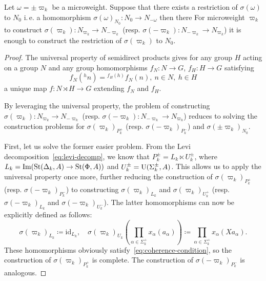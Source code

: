 \begin{lemma} \label{lem:first-reduction}
 Let $\omega = \pm \varpi_k$ be a microweight.
 Suppose that there exists a restriction of $\sigma(\omega)$ to $N_0$ i.\,e. a homomorphism
 $\sigma(\omega)_{N_0} \colon N_0 \to N_{-\omega}$
 then there
 For microweight $\varpi_k$ to construct $\sigma(\varpi_k) \colon N_{\varpi_k} \to N_{-\varpi_k}$
 (resp. $\sigma(-\varpi_k)\colon N_{-\varpi_k} \to N_{\varpi_k}$) it is enough to construct the restriction of $\sigma(\varpi_k)$ to $N_0$.
\end{lemma}
\begin{proof}

    The universal property of semidirect products gives for any group $H$ acting on a group $N$
    and any group homomorphisms $f_N\colon N \to G$, $f_H\colon H \to G$ satisfying
    \begin{equation}
        \label{eq:coherence-condition} f_N({}^hn) = {}^{f_H(h)} f_N(n),\ n\in N,\ h\in H
    \end{equation}
    a unique map $f\colon N \rtimes H \to G$ extending $f_N$ and $f_H$.

    By leveraging the universal property, the problem of constructing \( \sigma(\varpi_k) \colon N_{\varpi_k} \to N_{-\varpi_k} \)
    (resp. $\sigma(-\varpi_k) \colon N_{-\varpi_k} \to N_{\varpi_k}$)
    reduces to solving the construction problems for \( \sigma(\varpi_k)_{P_k^+} \) (resp. $\sigma(-\varpi_k)_{P_k^-}$) and \( \sigma(\pm\varpi_k)_{N_0} \).

    First, let us solve the former easier problem.
    From the Levi decomposition~\eqref{eq:levi-decomp}, we know that \( P_k^\pm = L_k \ltimes U_k^\pm \), where \( L_k = \mathrm{Im}(\operatorname{St}(\Delta_k, A) \to \operatorname{St}(\Phi, A)) \) and \( U_k^\pm = \operatorname{U}(\Sigma_k^\pm, A) \).
    This allows us to apply the universal property once more, further reducing the construction of \( \sigma(\varpi_k)_{P_k^+} \) (resp. $\sigma(-\varpi_k)_{P_k^-}$)
    to constructing \( \sigma(\varpi_k)_{L_k} \) and \( \sigma(\varpi_k)_{U_k^+} \) (resp. \( \sigma(-\varpi_k)_{L_k} \) and \( \sigma(-\varpi_k)_{U_k^-} \)).
    The latter homomorphisms can now be explicitly defined as follows:
    \begin{equation} \label{eq:sigma-Pk} \sigma(\varpi_k)_{L_k} \coloneqq \mathrm{id}_{L_k}, \quad \sigma(\varpi_k)_{U_k} \left(\prod_{\alpha \in \Sigma_k^+} x_\alpha(a_\alpha)\right) \coloneqq \prod_{\alpha \in \Sigma_k^+} x_\alpha(Xa_\alpha).\end{equation}
    These homomorphisms obviously satisfy~\eqref{eq:coherence-condition}, so the construction of \( \sigma(\varpi_k)_{P_k^+} \) is complete.
    The construction of \( \sigma(-\varpi_k)_{P_k^-} \) is analogous.
\end{proof}

